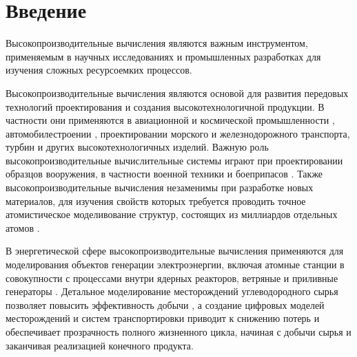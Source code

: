 \newpage
\section*{Введение}                      %


Высокопроизводительные вычисления \cite{GOST57700HPC} являются важным инструментом, применяемым в научных исследованиях и промышленных разработках для изучения сложных ресурсоемких процессов.

Высокопроизводительные вычисления являются основой для развития передовых технологий проектирования и создания высокотехнологичной продукции.
В частности они применяются в авиационной и космической промышленности \cite{Kornev2021SuperAvio}, автомобилестроении \cite{Wang2020SuperAuto}, проектировании морского и железнодорожного транспорта, турбин и других высокотехнологичных изделий.
Важную роль высокопроизводительные вычислительные системы играют при проектировании образцов вооружения, в частности военной техники и боеприпасов \cite{Ageeva2023SuperMilitary}.
Также высокопроизводительные вычисления незаменимы при разработке новых материалов, для изучения свойств которых требуется проводить точное атомистическое моделивование структур, состоящих из миллиардов отдельных атомов \cite{Wang2025SuperMolDyn}.

В энергетической сфере высокопроизводительные вычисления применяются для моделирования объектов генерации электроэнергии, включая атомные станции \cite{Cancemi2025SuperNuc} в совокупности с процессами внутри ядерных реакторов, ветряные и приливные генераторы \cite{Quint2025SuperWind}.
Детальное моделирование месторождений углеводородного сырья позволяет повысить эффективность добычи \cite{Usmanov2024SuperPlast}, а создание цифровых моделей месторождений и систем транспортировки \cite{Didenko2023SuperOil} приводит к снижению потерь и обеспечивает прозрачность полного жизненного цикла, начиная с добычи сырья и заканчивая реализацией конечного продукта.

